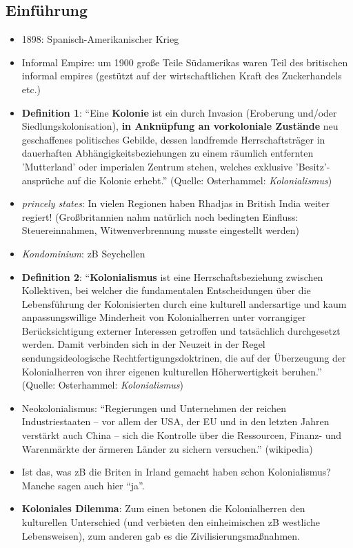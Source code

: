 \documentclass[emulatestandardclasses]{scrartcl}
\begin{document}
\subsection{Einführung}

\begin{itemize}
  \item 1898: Spanisch-Amerikanischer Krieg
  \item Informal Empire: um 1900 große Teile Südamerikas waren Teil des britischen informal empires (gestützt auf der wirtschaftlichen Kraft des Zuckerhandels etc.)
  \item \textbf{Definition 1}: "`Eine \textbf{Kolonie} ist ein durch Invasion (Eroberung und/oder Siedlungskolonisation), \textbf{in Anknüpfung an vorkoloniale Zustände} neu geschaffenes politisches Gebilde, dessen landfremde Herrschaftsträger in dauerhaften Abhängigkeitsbeziehungen zu einem räumlich entfernten 'Mutterland' oder imperialen Zentrum stehen, welches exklusive 'Besitz'-ansprüche auf die Kolonie erhebt."' (Quelle: Osterhammel: \emph{Kolonialismus})
  \item \emph{princely states}: In vielen Regionen haben Rhadjas in British India weiter regiert! (Großbritannien nahm natürlich noch bedingten Einfluss: Steuereinnahmen, Witwenverbrennung musste eingestellt werden)
  \item \emph{Kondominium}: zB Seychellen
  \item \textbf{Definition 2}: "`\textbf{Kolonialismus} ist eine Herrschaftsbeziehung zwischen Kollektiven, bei welcher die fundamentalen Entscheidungen über die Lebensführung der Kolonisierten durch eine kulturell andersartige und kaum anpassungswillige Minderheit von Kolonialherren unter vorrangiger Berücksichtigung externer Interessen getroffen und tatsächlich durchgesetzt werden. Damit verbinden sich in der Neuzeit in der Regel sendungsideologische Rechtfertigungsdoktrinen, die auf der Überzeugung der Kolonialherren von ihrer eigenen kulturellen Höherwertigkeit beruhen."' (Quelle: Osterhammel: \emph{Kolonialismus})
  \item Neokolonialismus: "`Regierungen und Unternehmen der reichen Industriestaaten – vor allem der USA, der EU und in den letzten Jahren verstärkt auch China – sich die Kontrolle über die Ressourcen, Finanz- und Warenmärkte der ärmeren Länder zu sichern versuchen."' (wikipedia)
  \item Ist das, was zB die Briten in Irland gemacht haben schon Kolonialismus? Manche sagen auch hier "`ja"'.
  \item \textbf{Koloniales Dilemma}: Zum einen betonen die Kolonialherren den kulturellen Unterschied (und verbieten den einheimischen zB westliche Lebensweisen), zum anderen gab es die Zivilisierungsmaßnahmen.

\end{itemize}
\end{document}
